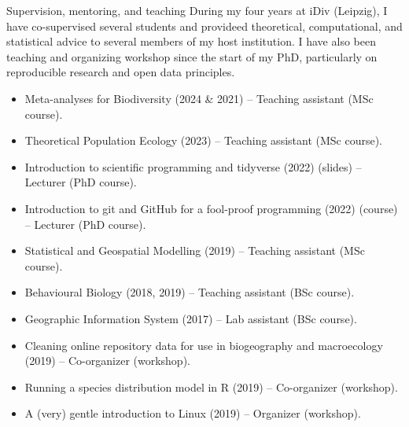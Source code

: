\documentclass{resume} %
\begin{document}
\begin{rSection}{Supervision, mentoring, and teaching}
During my four years at iDiv (Leipzig), I have co-supervised several students and provideed theoretical, computational, and statistical advice to several members of my host institution.
I have also been teaching and organizing workshop since the start of my PhD, particularly on reproducible research and open data principles.
\begin{itemize}
    \setlength\itemsep{-0.5em}
    \item Meta-analyses for Biodiversity (2024 \& 2021) – Teaching assistant (MSc course).
    \item Theoretical Population Ecology (2023) – Teaching assistant (MSc course).
    \item Introduction to scientific programming and tidyverse (2022) (slides) – Lecturer (PhD course).
    \item Introduction to git and GitHub for a fool-proof programming (2022) (course) – Lecturer (PhD course).
    \item Statistical and Geospatial Modelling (2019) – Teaching assistant (MSc course).
    \item Behavioural Biology (2018, 2019) – Teaching assistant (BSc course).
    \item Geographic Information System (2017) – Lab assistant (BSc course).
    \item Cleaning online repository data for use in biogeography and macroecology (2019) -- Co-organizer (workshop).
    \item Running a species distribution model in R (2019) -- Co-organizer (workshop).
    \item A (very) gentle introduction to Linux (2019) -- Organizer (workshop).
\end{itemize}
\end{rSection}
\end{document}
